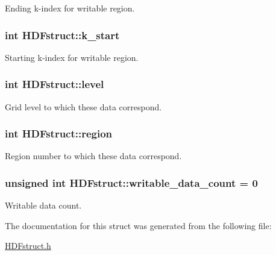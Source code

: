 Ending k-\/index for writable region. 

\subsubsection[{\texorpdfstring{k\+\_\+start}{k_start}}]{\setlength{\rightskip}{0pt plus 5cm}int H\+D\+Fstruct\+::k\+\_\+start}\hypertarget{struct_h_d_fstruct_ae6c59193877bd77a0fb06b4af3f6ae72}{}\label{struct_h_d_fstruct_ae6c59193877bd77a0fb06b4af3f6ae72}


Starting k-\/index for writable region. 

\subsubsection[{\texorpdfstring{level}{level}}]{\setlength{\rightskip}{0pt plus 5cm}int H\+D\+Fstruct\+::level}\hypertarget{struct_h_d_fstruct_aef9143324c08da8bcdce294e37e9ddd3}{}\label{struct_h_d_fstruct_aef9143324c08da8bcdce294e37e9ddd3}


Grid level to which these data correspond. 

\subsubsection[{\texorpdfstring{region}{region}}]{\setlength{\rightskip}{0pt plus 5cm}int H\+D\+Fstruct\+::region}\hypertarget{struct_h_d_fstruct_a9a6355bf67ceed24a4f22bc9df6e2400}{}\label{struct_h_d_fstruct_a9a6355bf67ceed24a4f22bc9df6e2400}


Region number to which these data correspond. 

\subsubsection[{\texorpdfstring{writable\+\_\+data\+\_\+count}{writable_data_count}}]{\setlength{\rightskip}{0pt plus 5cm}unsigned int H\+D\+Fstruct\+::writable\+\_\+data\+\_\+count = 0}\hypertarget{struct_h_d_fstruct_a1a5b120987c361f65c19d906bf66c533}{}\label{struct_h_d_fstruct_a1a5b120987c361f65c19d906bf66c533}


Writable data count. 



The documentation for this struct was generated from the following file\+:\begin{DoxyCompactItemize}
\item 
\hyperlink{_h_d_fstruct_8h}{H\+D\+Fstruct.\+h}\end{DoxyCompactItemize}
